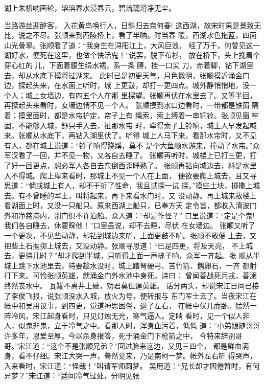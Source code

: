 湖上朱桥响画轮，溶溶春水浸春云，碧琉璃滑净无尘。

当路游丝迎醉客，
入花黄鸟唤行人，日斜归去奈何春!
这西湖，故宋时果是景致无比，说之不尽。张顺来到西陵桥上，看了半晌。时当春
暖，西湖水色拖蓝，四面山光叠翠。张顺看了道：“我身生在浔阳江上，大风巨浪，
经了万千，何曾见这一湖好水，便死在这里，也做个快活鬼！”说罢，脱下布衫，
放在桥下，头上挽着个穿心红的儿，下面着腰生绢水裙，系一条膊，挂一口尖
刀，赤着脚，钻下湖里去，却从水底下摸将过湖来。
此时已是初更天气，月色微明，张顺摸近涌金门边，探起头来，在水面上听时，城
上更鼓，却打一更四点。城外静悄悄地，没一个人；城上女墙边，有四五个人在那
里探望。张顺再伏在水里去了。又等半回，再探起头来看时，女墙边悄不见一个人。
张顺摸到水口边看时，一带都是铁窗隔着；摸里面时，都是水帘护定，帘子上有
绳索，索上缚着一串铜铃。张顺见窗牢固，不能够入城，舒只手入去，扯那水帘
时，牵得索子上铃响，城上人早发起喊来。张顺从水底下，再钻入湖里伏了。听得
城上人马下来，看那水帘时，又不见有人，都在城上说道：“铃子响得跷蹊，莫不
是个大鱼顺水游来，撞动了水帘。”众军汉看了一回，并不见一物，又各自去睡了。
张顺再听时，城楼上已打三更，打了好一回更点，想必军人各自去东倒西歪睡熟了。
张顺再钻向城边去，料是水里入不得城。爬上岸来看时，那城上不见一个人在上面，
便欲要爬上城去，且又寻思道：“倘或城上有人，却不干折了性命，我且试探一试
探。”摸些土块，掷撒上城去。有不曾睡的军士，叫将起来，再下来看水门时，又
没动静。再上城来敌楼上看湖面上时，又没一只船只。原来西湖上船只，已奉方天
定令旨，都收入清波门外和净慈港内，别门俱不许泊船。众人道：“却是作怪？”
口里说道：“定是个鬼!我们各自睡去，休要睬他！”口里虽说，却不去睡，尽伏
在女墙边。
张顺又听了一个更次，不见些动静，却钻到城边来听，上面更鼓不响。张顺不敢便
上去，又把些土石抛掷上城去，又没动静。张顺寻思道：“已是四更，将及天亮，
不上城去，更待几时？”却才爬到半城，只听得上面一声梆子响，众军一齐起。张
顺从半城上跳下水池里去，待要趁水没时，城上踏弩硬弓、苦竹箭、鹅卵石，一齐
都射打下来。可怜张顺英雄，就涌金门外水池中身死。诗曰：
曾闻善战死兵戎，善溺终然丧水中。
瓦罐不离井上破，劝君莫但逞英雄。
话分两头，却说宋江日间已接了李俊飞报，说张顺没水入城，放火为号，便转报与
东门军士去了。当夜宋江在帐中和吴用议事，到四更，觉道神思困倦，退了左右，
在帐中伏几而卧。猛然一阵冷风，宋江起身看时，只见灯烛无光，寒气逼人。定睛
看时，见一个似人非人，似鬼非鬼，立于冷气之中。看那人时，浑身血污着，低低
道：“小弟跟随哥哥许多年，恩爱至厚。今以杀身报答，死于涌金门下枪箭之中，
今特来辞别哥哥。”宋江道：“这个不是张顺兄弟？”回过脸来这边，又见三四个，
都是鲜血满身，看不仔细。宋江大哭一声，蓦然觉来，乃是南柯一梦。帐外左右听
得哭声，入来看时，宋江道：“怪哉！”叫请军师圆梦。
吴用道：“兄长却才困倦暂时，有何异梦？”宋江道：“适间冷气过处，分明见张
